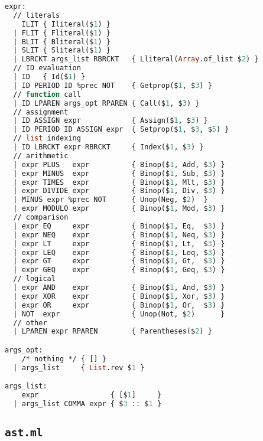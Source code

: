 \begin{lstlisting}[language=Caml,backgroundcolor=\color{backgroundcolor}]
expr:
  // literals
    ILIT { Iliteral($1) }
  | FLIT { Fliteral($1) }
  | BLIT { Bliteral($1) }
  | SLIT { Sliteral($1) }
  | LBRCKT args_list RBRCKT   { Lliteral(Array.of_list $2) }
  // ID evaluation
  | ID   { Id($1) }
  | ID PERIOD ID %prec NOT    { Getprop($1, $3) }
  // function call
  | ID LPAREN args_opt RPAREN { Call($1, $3) }
  // assignment
  | ID ASSIGN expr            { Assign($1, $3) }
  | ID PERIOD ID ASSIGN expr  { Setprop($1, $3, $5) }
  // list indexing
  | ID LBRCKT expr RBRCKT     { Index($1, $3) }
  // arithmetic
  | expr PLUS   expr          { Binop($1, Add, $3) }
  | expr MINUS  expr          { Binop($1, Sub, $3) }
  | expr TIMES  expr          { Binop($1, Mlt, $3) }
  | expr DIVIDE expr          { Binop($1, Div, $3) }
  | MINUS expr %prec NOT      { Unop(Neg, $2)  }
  | expr MODULO expr          { Binop($1, Mod, $3) }
  // comparison
  | expr EQ     expr          { Binop($1, Eq,  $3) }
  | expr NEQ    expr          { Binop($1, Neq, $3) }
  | expr LT     expr          { Binop($1, Lt,  $3) }
  | expr LEQ    expr          { Binop($1, Leq, $3) }
  | expr GT     expr          { Binop($1, Gt,  $3) }
  | expr GEQ    expr          { Binop($1, Geq, $3) }
  // logical
  | expr AND    expr          { Binop($1, And, $3) }
  | expr XOR    expr          { Binop($1, Xor, $3) }
  | expr OR     expr          { Binop($1, Or,  $3) }
  | NOT  expr                 { Unop(Not, $2)      }
  // other
  | LPAREN expr RPAREN        { Parentheses($2) }

args_opt:
    /* nothing */ { [] }
  | args_list     { List.rev $1 }

args_list:
    expr                 { [$1]     }
  | args_list COMMA expr { $3 :: $1 }
\end{lstlisting}

\subsection{\texttt{ast.ml}}

